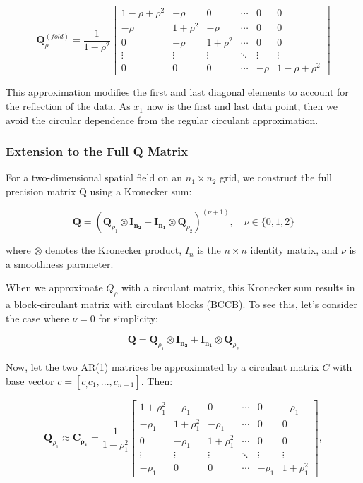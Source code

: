 \documentclass[journal=,manuscript=]{achemso}
\begin{document}
\[
\mathbf{Q}_\rho^{(fold)} = \frac{1}{1-\rho^2}
\begin{bmatrix}
1-\rho+\rho^2 & -\rho & 0 & \cdots & 0 & 0 \\
-\rho & 1+\rho^2 & -\rho & \cdots & 0 & 0 \\
0 & -\rho & 1+\rho^2 & \cdots & 0 & 0 \\
\vdots & \vdots & \vdots & \ddots & \vdots & \vdots \\
0 & 0 & 0 & \cdots & -\rho & 1-\rho+\rho^2
\end{bmatrix}
\]

This approximation modifies the first and last diagonal elements to
account for the reflection of the data. As \(x_1\) now is the first and
last data point, then we avoid the circular dependence from the regular
circulant approximation.

\subsubsection{Extension to the Full Q
Matrix}\label{extension-to-the-full-q-matrix}

For a two-dimensional spatial field on an \(n_1 \times n_2\) grid, we
construct the full precision matrix Q using a Kronecker sum:

\[
\mathbf{Q} = \left( \mathbf{Q}_{\rho_1} \otimes \mathbf{I_{n_2}} + \mathbf{I_{n_1}} \otimes \mathbf{Q}_{\rho_2} \right)^{(\nu + 1)}, \quad \nu \in \{0, 1, 2\}
\]

where \(\otimes\) denotes the Kronecker product, \(I_n\) is the
\(n \times n\) identity matrix, and \(\nu\) is a smoothness parameter.

When we approximate \(Q_\rho\) with a circulant matrix, this Kronecker
sum results in a block-circulant matrix with circulant blocks (BCCB). To
see this, let's consider the case where \(\nu = 0\) for simplicity:

\[
\mathbf{Q} = \mathbf{Q}_{\rho_1} \otimes \mathbf{I_{n_2}} + \mathbf{I_{n_1}} \otimes \mathbf{Q}_{\rho_2}
\]

Now, let the two AR(1) matrices be approximated by a circulant matrix
\(C\) with base vector \(c = [c_, c_1, ..., c_{n-1}]\). Then:

\[
\mathbf{Q}_{\rho_1} \approx \mathbf{C_{\rho_1}} = \frac{1}{1-\rho_1^2}
\begin{bmatrix}
1+\rho_1^2 & -\rho_1 & 0 & \cdots & 0 & -\rho_1 \\
-\rho_1 & 1+\rho_1^2 & -\rho_1 & \cdots & 0 & 0 \\
0 & -\rho_1 & 1+\rho_1^2 & \cdots & 0 & 0 \\
\vdots & \vdots & \vdots & \ddots & \vdots & \vdots \\
-\rho_1 & 0 & 0 & \cdots & -\rho_1 & 1+\rho_1^2
\end{bmatrix},
\]
\end{document}
